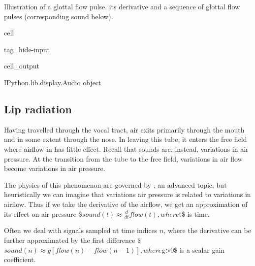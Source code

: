 \documentclass[letterpaper,10pt,english]{jupyterBook}
\begin{document}
\sphinxAtStartPar
{}

\sphinxAtStartPar
Illustration of a glottal flow pulse, its derivative and a sequence of
glottal flow pulses (corresponding sound below).

\begin{sphinxuseclass}{cell}
\begin{sphinxuseclass}{tag_hide-input}\begin{sphinxVerbatimOutput}

\begin{sphinxuseclass}{cell_output}
\begin{sphinxVerbatim}[commandchars=\\\{\}]
\PYGZlt{}IPython.lib.display.Audio object\PYGZgt{}
\end{sphinxVerbatim}

\end{sphinxuseclass}\end{sphinxVerbatimOutput}

\end{sphinxuseclass}
\end{sphinxuseclass}

\subsection{Lip radiation}
\label{\detokenize{Introduction/Speech_production_and_acoustic_properties:lip-radiation}}
\sphinxAtStartPar
Having travelled through the vocal tract, air exits primarily through
the mouth and in some extent through the nose. In leaving this tube, it
enters the free field where airflow in has little effect. Recall that
sounds are, instead, variations in air pressure. At the transition from
the tube to the free field, variations in air flow become variations in
air pressure.

\sphinxAtStartPar
The physics of this phenomenon are governed by , an advanced
topic, but heuristically we can imagine that variations air pressure is
related to variations in airflow. Thus if we take the derivative of the
airflow, we get an approximation of its effect on air pressure
\$\( sound(t) \approx \frac d{dt} flow(t), \)\(
where \)t\$ is time.

\sphinxAtStartPar
Often we deal with signals sampled at time indices \(n\), where the
derivative can be further approximated by the first difference
\$\( 
sound(n) \approx g \left[flow(n) - flow(n-1)\right], 
\)\(
where \)g>0\$ is a scalar gain coefficient.
\end{document}
